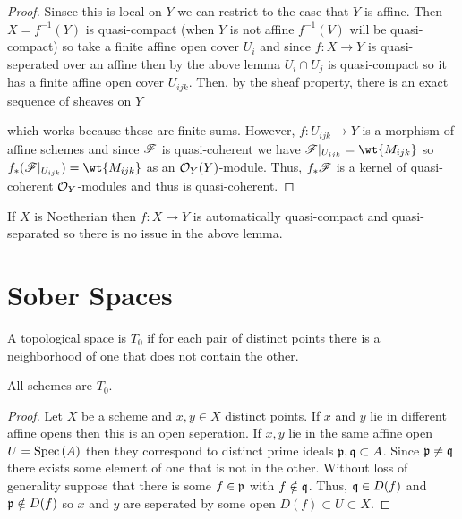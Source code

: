 \documentclass[12pt]{article}
\begin{document}
\begin{proof}
Sinsce this is local on $Y$ we can restrict to the case that $Y$ is affine. Then   $X = f^{-1}(Y)$ is quasi-compact (when $Y$ is not affine $f^{-1}(V)$ will be quasi-compact) so take a finite affine open cover $U_i$ and since $f : X \to Y$ is quasi-seperated over an affine then by the above lemma $U_i \cap U_j$ is quasi-compact so it has a finite affine open cover $U_{ijk}$. Then, by the sheaf property, there is an exact sequence of sheaves on $Y$
\begin{center}
\end{center}
which works because these are finite sums. However, $f : U_{ijk} \to Y$ is a morphism of affine schemes and since $\mathscr{F}$ is quasi-coherent we have $\F |_{U_{ijk}} = \wt{M_{ijk}}$ so $f_* (\F|_{U_{ijk}}) = \wt{M_{ijk}}$ as an $\mathcal{O}_{Y}(Y)$-module. Thus, $f_* \mathscr{F}$ is a kernel of quasi-coherent $\mathcal{O}_{Y}$-modules and thus is quasi-coherent. 
\end{proof}

\begin{rmk}
If $X$ is Noetherian then $f : X \to Y$ is automatically quasi-compact and quasi-separated so there is no issue in the above lemma.
\end{rmk}


\section{Sober Spaces}

\begin{definition}
A topological space is $T_0$ if for each pair of distinct points there is a neighborhood of one that does not contain the other. 
\end{definition}

\begin{proposition}
All schemes are $T_0$. 
\end{proposition}

\begin{proof}
Let $X$ be a scheme and $x, y \in X$ distinct points. If $x$ and $y$ lie in different affine opens then this is an open seperation. If $x, y$ lie in the same affine open $U = \mathrm{Spec}\left( A \right)$ then they correspond to distinct prime ideals $\mathfrak{p}, \mathfrak{q} \subset A$. Since $\mathfrak{p} \neq \mathfrak{q}$ there exists some element of one that is not in the other. Without loss of generality suppose that there is some $f \in \mathfrak{p}$ with $f \notin \mathfrak{q}$. Thus, $\mathfrak{q} \in D(f)$ and $\mathfrak{p} \notin D(f)$ so $x$ and $y$ are seperated by some open $D(f) \subset U \subset X$.  
\end{proof}
\end{document}
